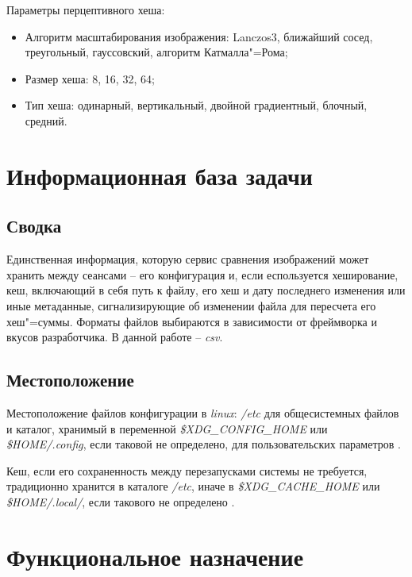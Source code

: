 Параметры перцептивного хеша:

\begin{itemize}
    \item Алгоритм масштабирования изображения: Lanczos3, ближайший сосед,
          треугольный, гауссовский, алгоритм Катмалла"=Рома;
    \item Размер хеша: 8, 16, 32, 64;
    \item Тип хеша: одинарный, вертикальный, двойной градиентный, блочный,
          средний.
\end{itemize}


\section{Информационная база задачи}

\subsection{Сводка}
Единственная информация, которую сервис сравнения изображений может хранить
между сеансами -- его конфигурация и, если еспользуется хеширование, кеш,
включающий в себя путь к файлу, его хеш и дату последнего изменения или иные
метаданные, сигнализирующие об изменении файла для пересчета его хеш"=суммы.
Форматы файлов выбираются в зависимости от фреймворка и вкусов разработчика. В
данной работе -- \textit{csv}.

\subsection{Местоположение}
Местоположение файлов конфигурации в \textit{linux}: \textit{/etc} для
общесистемных файлов и каталог, хранимый в переменной
\textit{\$XDG\_CONFIG\_HOME} или \textit{\$HOME/.config}, если таковой не
определено, для пользовательских параметров \cite{xdg_base_directory_spec}.

Кеш, если его сохраненность между перезапусками системы не требуется,
традиционно хранится в каталоге \textit{/etc}, иначе в
\textit{\$XDG\_CACHE\_HOME} или \textit{\$HOME/.local/}, если такового не
определено \cite{xdg_base_directory_spec}.

\section{Функциональное назначение}

